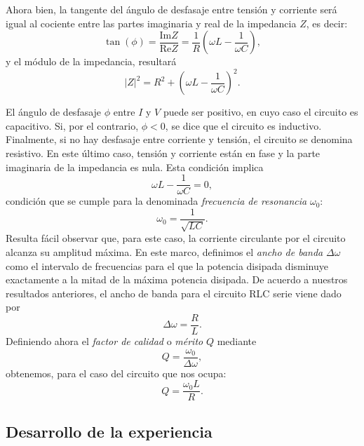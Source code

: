\documentclass[laboratorio]{guia}
\begin{document}
Ahora bien, la tangente del \'angulo de desfasaje entre tensi\'on y corriente
ser\'a igual al cociente entre las partes imaginaria y real de la impedancia
$Z$, es decir:
\begin{equation}
    \tan \left( \phi \right) = \frac{\text{Im} Z}{\text{Re} Z} = 
    \frac{1}{R} \left(\omega L - \frac{1}{\omega C} \right),
\end{equation}
y el m\'odulo de la impedancia, resultar\'a
\begin{equation}
    |Z|^2 = R^2 + \left( \omega L - \frac{1}{\omega C} \right)^2.
\end{equation}

El \'angulo de desfasaje $\phi$ entre $I$ y $V$ puede ser positivo, en cuyo
caso el circuito es capacitivo. Si, por el contrario, $\phi < 0$, se dice que
el circuito es inductivo. Finalmente, si no hay desfasaje entre corriente y 
tensi\'on, el circuito se denomina resistivo. En este \'ultimo caso, tensi\'on
y corriente est\'an en fase y la parte imaginaria de la impedancia es nula.
Esta condici\'on implica
\begin{equation}
    \omega L - \frac{1}{\omega C} = 0,
\end{equation}
condici\'on que se cumple para la denominada {\it frecuencia de resonancia} 
$\omega_0$:
\begin{equation}
    \omega_0 = \frac{1}{\sqrt{LC}}.
\end{equation}
Resulta f\'acil observar que, para este caso, la corriente circulante por 
el circuito alcanza su amplitud m\'axima. En este marco, definimos el 
{\it ancho de banda} $\Delta \omega$ como el intervalo de frecuencias para
el que la potencia disipada disminuye exactamente a la mitad de la m\'axima
potencia disipada. De acuerdo a nuestros resultados anteriores, el 
ancho de banda para el circuito RLC serie viene dado por
\begin{equation}
    \Delta \omega = \frac{R}{L}.
\end{equation}
Definiendo ahora el {\it factor de calidad} o {\it m\'erito} $Q$ mediante
\begin{equation}
    Q = \frac{\omega_0}{\Delta \omega},
\end{equation}
obtenemos, para el caso del circuito que nos ocupa:
\begin{equation}
    Q = \frac{\omega_0 L}{R}.
\end{equation}

\subsection{Desarrollo de la experiencia}
\end{document}

